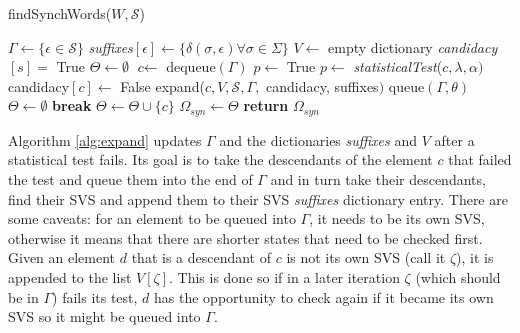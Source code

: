 {\begin{algorithm} 
  \caption{findSynchWords($W, \mathcal{S}$)\label{alg:findsynchwords}}
    \begin{algorithmic}[1]
      	\State $\Gamma \gets \{\epsilon \in \mathcal{S}\}$ 
        \State \textit{suffixes}$[\epsilon ] \gets \{\delta (\sigma , \epsilon) \forall \sigma \in \Sigma \}$
        \State $V \gets$ empty dictionary
        	\State \textit{candidacy}$[s] = $ True
        \EndFor
        \State $\Theta \gets \emptyset$ 
      \EndProcedure	
      	\While{$\Gamma \neq \emptyset$}
        	\State $\textit{c} \leftarrow$ dequeue$(\Gamma)$
        		\State $p \leftarrow$ True
        				\State $p \leftarrow$ \textit{statisticalTest}($c, \lambda, \alpha)$
        					\State candidacy$[c] \gets$ False
        					\State expand($c, V, \mathcal{S}, \Gamma,$ candidacy, suffixes$)$
        						\State queue$(\Gamma,\theta)$
        					\EndFor
        					\State $\Theta \leftarrow \emptyset$
        					\State \textbf{break}
        				\EndIf
        			\EndFor
        		\EndIf
        			\State $\Theta \gets \Theta \cup \{c\}$
        		\EndIf
        	\EndIf
      	\EndWhile
      	\State $\Omega_{syn} \gets \Theta$
      	\State \textbf{return} $\Omega_{syn}$
      \EndProcedure
    \end{algorithmic}
  \end{algorithm}
  
Algorithm \ref{alg:expand} updates $\Gamma$ and the dictionaries \textit{suffixes} and $V$ after a statistical test fails. Its goal is to take the descendants of the element $c$ that failed the test and queue them into the end of $\Gamma$ and in turn take their descendants, find their SVS and append them to their SVS \textit{suffixes} dictionary entry. There are some caveats: for an element to be queued into $\Gamma$, it needs to be its own SVS, otherwise it means that there are shorter states that need to be checked first. Given an element $d$ that is a descendant of $c$ is not its own SVS (call it $\zeta$), it is appended to the list $V[\zeta]$. This is done so if in a later iteration $\zeta$ (which should be in $\Gamma$) fails its test, $d$ has the opportunity to check again if it became its own SVS so it might be queued into $\Gamma$.

}

